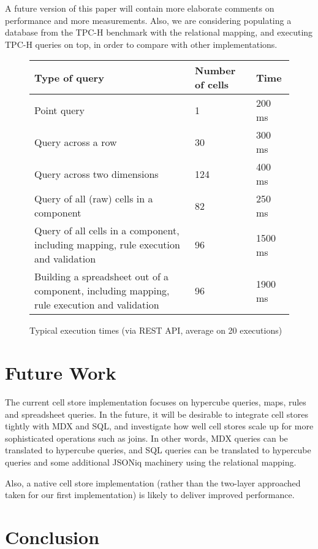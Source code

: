 \documentclass{vldb}
\begin{document}
A future version of this paper will contain more elaborate comments on performance and more measurements. Also, we are considering populating a database from the TPC-H benchmark with the relational mapping, and executing TPC-H queries on top, in order to compare with other implementations.

\begin{figure*}
\caption{Typical execution times (via REST API, average on 20 executions)}
\label{fig-measurements}
\begin{tabular}{|l|l|l|}
\hline
Type of query & Number of cells & Time \\
\hline
\hline
Point query & 1 & 200 ms \\
\hline
Query across a row&30& 300 ms \\
\hline
Query across two dimensions&124& 400 ms \\
\hline
Query of all (raw) cells in a component &82& 250 ms \\
\hline
Query of all cells in a component, including mapping, rule execution and validation& 96& 1500 ms \\
\hline
Building a spreadsheet out of a component, including mapping, rule execution and validation & 96 & 1900 ms \\
\hline
\end{tabular}
\end{figure*}

\section{Future Work}

The current cell store implementation focuses on hypercube queries, maps, rules and spreadsheet queries. In the future, it will be desirable to integrate cell stores tightly with MDX and SQL, and investigate how well cell stores scale up for more sophisticated operations such as joins. In other words, MDX queries can be translated to hypercube queries, and SQL queries can be translated to hypercube queries and some additional JSONiq machinery using the relational mapping.

Also, a native cell store implementation (rather than the two-layer approached taken for our first implementation) is likely to deliver improved performance.

\section{Conclusion}
\end{document}
